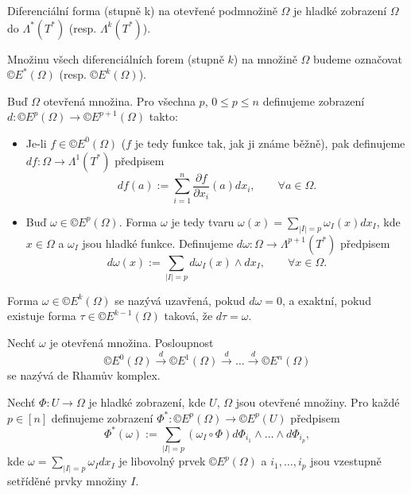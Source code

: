 \documentclass[12pt]{article}                   %
\begin{document}
        \begin{definice}[Diferenciální forma, diferenciální forma stupně $k$ (= $k$-forma)]
            Diferenciální forma (stupně k) na otevřené podmnožině $\Omega$ je hladké zobrazení $\Omega$ do $\Lambda^*(T^*)$ (resp. $\Lambda^k(T^*)$).

            Množinu všech diferenciálních forem (stupně $k$) na množině $\Omega$ budeme označovat $©E^*(\Omega)$ (resp. $©E^k(\Omega)$).
        \end{definice}

        \begin{definice}
            Buď $\Omega$ otevřená množina. Pro všechna $p$, $0 ≤ p ≤ n$ definujeme zobrazení $d: ©E^p(\Omega) \rightarrow ©E^{p + 1}(\Omega)$ takto:

            \begin{itemize}
                \item Je-li $f \in ©E^0(\Omega)$ ($f$ je tedy funkce tak, jak ji známe běžně), pak definujeme $df: \Omega \rightarrow \Lambda^1(T^*)$ předpisem
                    $$ df(a) := \sum_{i=1}^n \frac{\partial f}{\partial x_i}(a) dx_i, \qquad \forall a \in \Omega. $$
            \item Buď $\omega \in ©E^p(\Omega)$. Forma $\omega$ je tedy tvaru $\omega(x) = \sum_{|I| = p} \omega_I(x)dx_I$, kde $x \in \Omega$ a $\omega_I$ jsou hladké funkce. Definujeme $d\omega: \Omega \rightarrow \Lambda^{p+1}(T^*)$ předpisem
                $$ d\omega(x) := \sum_{|I| = p} d\omega_I(x) \wedge dx_I, \qquad \forall x \in \Omega. $$ 
            \end{itemize}
        \end{definice}

        \begin{definice}
            Forma $\omega \in ©E^k(\Omega)$ se nazývá uzavřená, pokud $d\omega = 0$, a exaktní, pokud existuje forma $\tau \in ©E^{k-1}(\Omega)$ taková, že $d\tau = \omega$.
        \end{definice}

        \begin{definice}
            Nechť $\omega$ je otevřená množina. Posloupnost
            $$ ©E^0(\Omega) \overset{d}{\rightarrow} ©E^1(\Omega) \overset{d}{\rightarrow} … \overset{d}{\rightarrow} ©E^n(\Omega) $$ 
            se nazývá de Rhamův komplex.
        \end{definice}

        \begin{definice}
            Nechť $\Phi: U \rightarrow \Omega$ je hladké zobrazení, kde $U$, $\Omega$ jsou otevřené množiny. Pro každé $p \in [n]$ definujeme zobrazení $\Phi^*: ©E^p(\Omega) \rightarrow ©E^p(U)$ předpisem
            $$ \Phi^*(\omega) := \sum_{|I| = p} (\omega_I \circ \Phi) d\Phi_{i_1} \wedge … \wedge d\Phi_{i_p}, $$
            kde $\omega = \sum_{|I| = p} \omega_I dx_I$ je libovolný prvek $©E^p(\Omega)$ a $i_1, …, i_p$ jsou vzestupně setříděné prvky množiny $I$.
        \end{definice}
\end{document}
